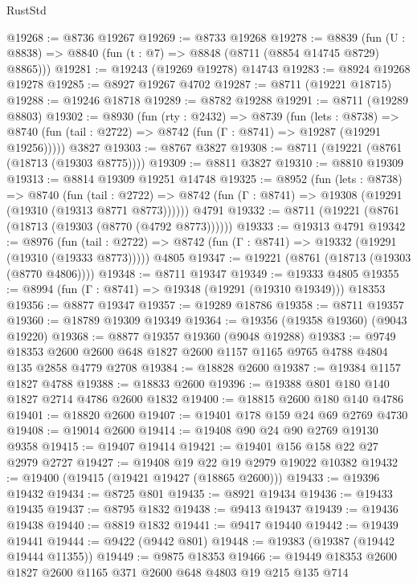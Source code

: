 \begin{lexlean}{RustStd}
\begin{coremodule}
@19268 := @8736 @19267
@19269 := @8733 @19268
@19278 := @8839
    (fun (U : @8838) => @8840 (fun (t : @7) => @8848 (@8711 (@8854 @14745 @8729) @8865)))
@19281 := @19243 (@19269 @19278) @14743
@19283 := @8924 @19268 @19278
@19285 := @8927 @19267 @4702
@19287 := @8711 (@19221 @18715)
@19288 := @19246 @18718
@19289 := @8782 @19288
@19291 := @8711 (@19289 @8803)
@19302 := @8930
    (fun (rty : @2432) =>
    @8739
      (fun (lets : @8738) =>
      @8740 (fun (tail : @2722) => @8742 (fun (Γ : @8741) => @19287 (@19291 @19256)))))
    @3827
@19303 := @8767 @3827
@19308 := @8711 (@19221 (@8761 (@18713 (@19303 @8775))))
@19309 := @8811 @3827
@19310 := @8810 @19309
@19313 := @8814 @19309 @19251 @14748
@19325 := @8952
    (fun (lets : @8738) =>
    @8740
      (fun (tail : @2722) =>
      @8742 (fun (Γ : @8741) => @19308 (@19291 (@19310 (@19313 @8771 @8773))))))
    @4791
@19332 := @8711 (@19221 (@8761 (@18713 (@19303 (@8770 (@4792 @8773))))))
@19333 := @19313 @4791
@19342 := @8976
    (fun (tail : @2722) => @8742 (fun (Γ : @8741) => @19332 (@19291 (@19310 (@19333 @8773)))))
    @4805
@19347 := @19221 (@8761 (@18713 (@19303 (@8770 @4806))))
@19348 := @8711 @19347
@19349 := @19333 @4805
@19355 := @8994 (fun (Γ : @8741) => @19348 (@19291 (@19310 @19349))) @18353
@19356 := @8877 @19347
@19357 := @19289 @18786
@19358 := @8711 @19357
@19360 := @18789 @19309 @19349
@19364 := @19356 (@19358 @19360) (@9043 @19220)
@19368 := @8877 @19357 @19360 (@9048 @19288)
@19383 := @9749
    @18353
    @2600
    @2600
    @648
    @1827
    @2600
    @1157
    @1165
    @9765
    @4788
    @4804
    @135
    @2858
    @4779
    @2708
@19384 := @18828 @2600
@19387 := @19384 @1157 @1827 @4788
@19388 := @18833 @2600
@19396 := @19388 @801 @180 @140 @1827 @2714 @4786 @2600 @1832
@19400 := @18815 @2600 @180 @140 @4786
@19401 := @18820 @2600
@19407 := @19401 @178 @159 @24 @69 @2769 @4730
@19408 := @19014 @2600
@19414 := @19408 @90 @24 @90 @2769 @19130 @9358
@19415 := @19407 @19414
@19421 := @19401 @156 @158 @22 @27 @2979 @2727
@19427 := @19408 @19 @22 @19 @2979 @19022 @10382
@19432 := @19400 (@19415 (@19421 @19427 (@18865 @2600)))
@19433 := @19396 @19432
@19434 := @8725 @801
@19435 := @8921 @19434
@19436 := @19433 @19435
@19437 := @8795 @1832
@19438 := @9413 @19437
@19439 := @19436 @19438
@19440 := @8819 @1832
@19441 := @9417 @19440
@19442 := @19439 @19441
@19444 := @9422 (@9442 @801)
@19448 := @19383 (@19387 (@19442 @19444 @11355))
@19449 := @9875 @18353
@19466 := @19449
    @18353
    @2600
    @1827
    @2600
    @1165
    @371
    @2600
    @648
    @4803
    @19
    @215
    @135
    @714

\end{coremodule}
\end{lexlean}
